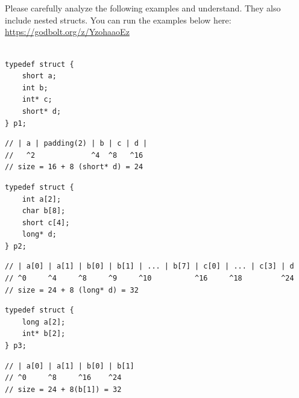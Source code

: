 \documentclass{article}
\begin{document}
\\
\\
Please carefully analyze the following examples and understand. They also include nested structs. You can run the examples below here: \url{https://godbolt.org/z/YzohaaoEz} \\
\\
\noindent\begin{minipage}{0.29\textwidth}
\begin{lstlisting}
typedef struct {
    short a; 
    int b;
    int* c;
    short* d;
} p1;  
\end{lstlisting}
\end{minipage}
\begin{minipage}{0.29\textwidth}
\begin{verbatim}
// | a | padding(2) | b | c | d |
//   ^2             ^4  ^8   ^16 
// size = 16 + 8 (short* d) = 24
\end{verbatim}
\end{minipage}

\vspace{1em}

\noindent\begin{minipage}{0.29\textwidth}
\begin{lstlisting}
typedef struct {
    int a[2];
    char b[8];
    short c[4];
    long* d;
} p2;
\end{lstlisting}
\end{minipage}
\begin{minipage}{0.29\textwidth}
\begin{verbatim}
// | a[0] | a[1] | b[0] | b[1] | ... | b[7] | c[0] | ... | c[3] | d
// ^0     ^4     ^8     ^9     ^10          ^16     ^18         ^24
// size = 24 + 8 (long* d) = 32
\end{verbatim}
\end{minipage}

\vspace{1em}

\noindent\begin{minipage}{0.29\textwidth}
\begin{lstlisting}
typedef struct {
    long a[2];
    int* b[2];
} p3;
\end{lstlisting}
\end{minipage}
\begin{minipage}{0.29\textwidth}
\begin{verbatim}
// | a[0] | a[1] | b[0] | b[1]
// ^0     ^8     ^16    ^24
// size = 24 + 8(b[1]) = 32
\end{verbatim}
\end{minipage}
\end{document}

